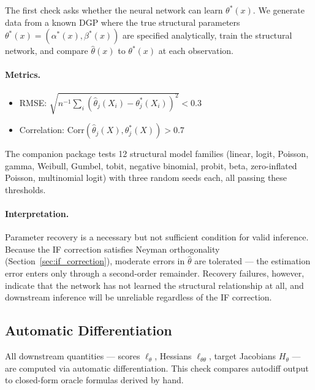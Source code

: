 The first check asks whether the neural network can learn $\theta^*(x)$. We generate data from a known DGP where the true structural parameters $\theta^*(x) = (\alpha^*(x), \beta^*(x))$ are specified analytically, train the structural network, and compare $\hat{\theta}(x)$ to $\theta^*(x)$ at each observation.

\paragraph{Metrics.}
\begin{itemize}
    \item RMSE: $\sqrt{n^{-1}\sum_i (\hat{\theta}_j(X_i) - \theta^*_j(X_i))^2} < 0.3$
    \item Correlation: $\mathrm{Corr}(\hat{\theta}_j(X), \theta^*_j(X)) > 0.7$
\end{itemize}

The companion package tests 12 structural model families (linear, logit, Poisson, gamma, Weibull, Gumbel, tobit, negative binomial, probit, beta, zero-inflated Poisson, multinomial logit) with three random seeds each, all passing these thresholds.

\paragraph{Interpretation.} Parameter recovery is a necessary but not sufficient condition for valid inference. Because the IF correction satisfies Neyman orthogonality (Section~\ref{sec:if_correction}), moderate errors in $\hat{\theta}$ are tolerated --- the estimation error enters only through a second-order remainder. Recovery failures, however, indicate that the network has not learned the structural relationship at all, and downstream inference will be unreliable regardless of the IF correction.

\subsection{Automatic Differentiation}\label{sec:eval_autodiff}

All downstream quantities --- scores $\ell_\theta$, Hessians $\ell_{\theta\theta}$, target Jacobians $H_\theta$ --- are computed via automatic differentiation. This check compares autodiff output to closed-form oracle formulas derived by hand.


